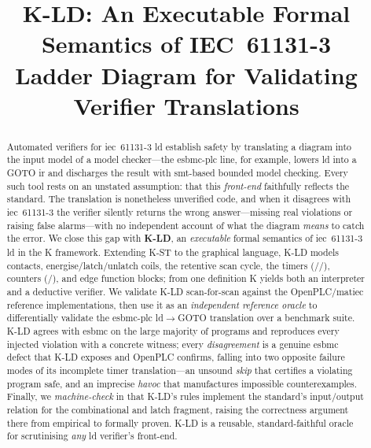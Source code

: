 
\providecommand{\kld}{\textsc{K-LD}}
\providecommand{\kst}{\textsc{K-ST}}



\title[\kld{}: Executable Semantics for IEC~61131-3 Ladder Diagram]{\kld{}: An Executable Formal Semantics of IEC~61131-3\\Ladder Diagram for Validating Verifier Translations}

\renewcommand{\shortauthors}{Anonymous}

\begin{abstract}
Automated verifiers for \gls{iec}~61131-3 \gls{ld} establish safety by translating
a diagram into the input model of a model checker---the \gls{esbmc}-\gls{plc} line,
for example, lowers \gls{ld} into a GOTO \gls{ir} and discharges the result with
\gls{smt}-based bounded model checking. Every such tool rests on an unstated
assumption: that this \emph{front-end} faithfully reflects the standard. The
translation is nonetheless unverified code, and when it disagrees with
\gls{iec}~61131-3 the verifier silently returns the wrong answer---missing real
violations or raising false alarms---with no independent account of what the
diagram \emph{means} to catch the error. We close this gap with \textbf{\kld{}}, an
\emph{executable} formal semantics of \gls{iec}~61131-3 \gls{ld} in the \textsf{K}
framework. Extending \kst{} to the graphical language, \kld{} models contacts,
energise/latch/unlatch coils, the retentive scan cycle, the timers
(//), counters (/), and edge
function blocks; from one definition \textsf{K} yields both an interpreter and a
deductive verifier. We validate \kld{} scan-for-scan against the OpenPLC/\gls{matiec}
reference implementations, then use it as an \emph{independent reference oracle} to
differentially validate the \gls{esbmc}-\gls{plc} \gls{ld}$\rightarrow$GOTO
translation over a benchmark suite. \kld{} agrees with \gls{esbmc} on the large
majority of programs and reproduces every injected violation with a concrete
witness; every \emph{disagreement} is a genuine \gls{esbmc} defect that \kld{}
exposes and OpenPLC confirms, falling into two opposite failure modes of its
incomplete timer translation---an unsound \emph{skip} that certifies a violating
program safe, and an imprecise \emph{havoc} that manufactures impossible
counterexamples. Finally, we \emph{machine-check} in  that \kld{}'s
rules implement the standard's input/output relation for the combinational and
latch fragment, raising the correctness argument there from empirical to formally
proven. \kld{} is a reusable, standard-faithful oracle for scrutinising \emph{any}
\gls{ld} verifier's front-end.
\end{abstract}


